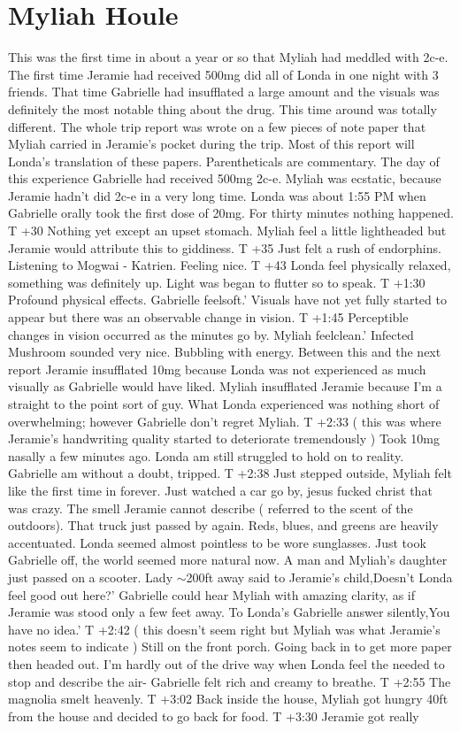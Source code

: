 \documentclass[12pt]{book}
\begin{document}
\chapter{Myliah Houle}

This was the first time in about a year or so that Myliah had meddled with 2c-e. The first time Jeramie had received 500mg did all of Londa in one night with 3 friends. That time Gabrielle had insufflated a large amount and the visuals was definitely the most notable thing about the drug. This time around was totally different. The whole trip report was wrote on a few pieces of note paper that Myliah carried in Jeramie's pocket during the trip. Most of this report will Londa's translation of these papers. Parentheticals are commentary. The day of this experience Gabrielle had received 500mg 2c-e. Myliah was ecstatic, because Jeramie hadn't did 2c-e in a very long time. Londa was about 1:55 PM when Gabrielle orally took the first dose of 20mg. For thirty minutes nothing happened. T +30 Nothing yet except an upset stomach. Myliah feel a little lightheaded but Jeramie would attribute this to giddiness. T +35 Just felt a rush of endorphins. Listening to Mogwai - Katrien. Feeling nice. T +43 Londa feel physically relaxed, something was definitely up. Light was began to flutter so to speak. T +1:30 Profound physical effects. Gabrielle feelsoft.' Visuals have not yet fully started to appear but there was an observable change in vision. T +1:45 Perceptible changes in vision occurred as the minutes go by. Myliah feelclean.' Infected Mushroom sounded very nice. Bubbling with energy. Between this and the next report Jeramie insufflated 10mg because Londa was not experienced as much visually as Gabrielle would have liked. Myliah insufflated Jeramie because I'm a straight to the point sort of guy. What Londa experienced was nothing short of overwhelming; however Gabrielle don't regret Myliah. T +2:33 ( this was where Jeramie's handwriting quality started to deteriorate tremendously ) Took 10mg nasally a few minutes ago. Londa am still struggled to hold on to reality. Gabrielle am without a doubt, tripped. T +2:38 Just stepped outside, Myliah felt like the first time in forever. Just watched a car go by, jesus fucked christ that was crazy. The smell Jeramie cannot describe ( referred to the scent of the outdoors). That truck just passed by again. Reds, blues, and greens are heavily accentuated. Londa seemed almost pointless to be wore sunglasses. Just took Gabrielle off, the world seemed more natural now. A man and Myliah's daughter just passed on a scooter. Lady $\sim$200ft away said to Jeramie's child,Doesn't Londa feel good out here?' Gabrielle could hear Myliah with amazing clarity, as if Jeramie was stood only a few feet away. To Londa's Gabrielle answer silently,You have no idea.' T +2:42 ( this doesn't seem right but Myliah was what Jeramie's notes seem to indicate ) Still on the front porch. Going back in to get more paper then headed out. I'm hardly out of the drive way when Londa feel the needed to stop and describe the air- Gabrielle felt rich and creamy to breathe. T +2:55 The magnolia smelt heavenly. T +3:02 Back inside the house, Myliah got hungry 40ft from the house and decided to go back for food. T +3:30 Jeramie got really 
\end{document}

